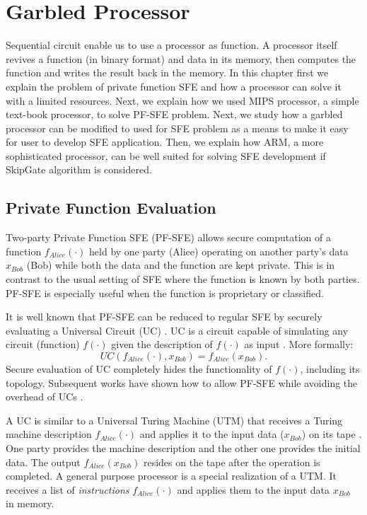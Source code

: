 \chapter{Garbled Processor}
Sequential circuit enable us to use a processor as function.
A processor itself revives a function (in binary format) and data in its memory, then computes the function and writes the result back in the memory.
In this chapter first we explain the problem of private function SFE and how a processor can solve it with a limited resources.
Next, we explain how we used MIPS processor, a simple text-book processor, to solve PF-SFE problem.
Next, we study how a garbled processor can be modified to used for SFE problem as a means to make it easy for user to develop SFE application.
Then, we explain how ARM, a more sophisticated processor, can be well suited for solving SFE development if SkipGate algorithm is considered.

\section{Private Function Evaluation}
Two-party Private Function SFE (PF-SFE) allows secure computation of a function $f_{Alice}(\cdot)$ held by one party (Alice) operating on another party's data $x_{Bob}$ (Bob) while both the data and the function are kept private.
This is in contrast to the usual setting of SFE where the function is known by both parties.
PF-SFE is especially useful when the function is proprietary or classified.

It is well known that PF-SFE can be reduced to regular SFE by securely evaluating a Universal Circuit (UC) \cite{sander1999non}.
UC is a circuit capable of simulating any circuit (function) $f(\cdot)$ given the description of $f(\cdot)$ as input \cite{valiant1976universal,kolesnikov2008practical}.
More formally:
$$UC(f_{Alice}(\cdot),x_{Bob}) = f_{Alice}(x_{Bob}).$$
Secure evaluation of UC completely hides the functionality of $f(\cdot)$, including its topology.
Subsequent works have shown how to allow PF-SFE while avoiding the overhead of UCs \cite{katz2011constant, mohassel2013hide}.

A UC is similar to a Universal Turing Machine (UTM) \cite{turing1936computable,herken1995universal} that receives a Turing machine description $f_{Alice}(\cdot)$ and applies it to the input data ($x_{Bob}$) on its tape \cite{davis2001engines}.
One party provides the machine description and the other one provides the initial data.
The output $f_{Alice}(x_{Bob})$ resides on the tape after the operation is completed.
A general purpose processor is a special realization of a UTM.
It receives a list of \emph{instructions} $f_{Alice}(\cdot)$ and applies them to the input data $x_{Bob}$ in memory.

